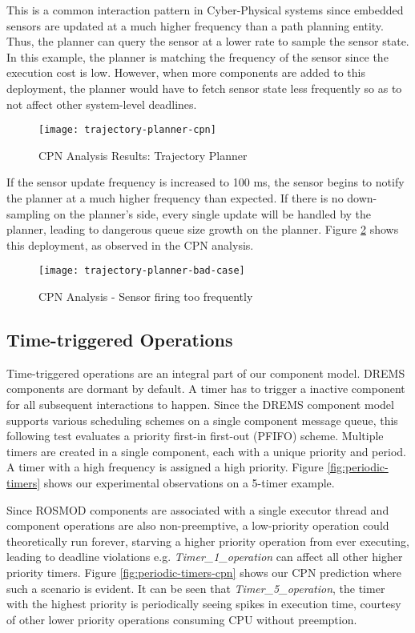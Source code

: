 This is a common interaction pattern in Cyber-Physical systems since embedded sensors are updated at a much higher frequency than a path planning entity. Thus, the planner can query the sensor at a lower rate to sample the sensor state. In this example, the planner is matching the frequency of the sensor since the execution cost is low. However, when more components are added to this deployment, the planner would have to fetch sensor state less frequently so as to not affect other system-level deadlines.  

\begin{figure}[h]
	\centering
	\texttt{[image: trajectory-planner-cpn]}
	\caption{CPN Analysis Results: Trajectory Planner}
	\label{fig:trajectory-planner-cpn}
\end{figure}
\FloatBarrier

If the sensor update frequency is increased to 100 ms, the sensor begins to notify the planner at a much higher frequency than expected. If there is no down-sampling on the planner's side, every single update will be handled by the planner, leading to dangerous queue size growth on the planner. Figure \ref{fig:trajectory-planner-bad-case} shows this deployment, as observed in the CPN analysis. 

\begin{figure}[h]
	\centering
	\texttt{[image: trajectory-planner-bad-case]}
	\caption{CPN Analysis - Sensor firing too frequently}
	\label{fig:trajectory-planner-bad-case}
\end{figure}
\FloatBarrier

\subsection{Time-triggered Operations}

Time-triggered operations are an integral part of our component model. DREMS components are dormant by default. A timer has to trigger a inactive component for all subsequent interactions to happen. Since the DREMS component model supports various scheduling schemes on a single component message queue, this following test evaluates a priority first-in first-out (PFIFO) scheme. Multiple timers are created in a single component, each with a unique priority and period. A timer with a high frequency is assigned a high priority. Figure \ref{fig:periodic-timers} shows our experimental observations on a 5-timer example. 

Since ROSMOD components are associated with a single executor thread and component operations are also non-preemptive, a low-priority operation could theoretically run forever, starving a higher priority operation from ever executing, leading to deadline violations e.g. \emph{Timer\_1\_operation} can affect all other higher priority timers. Figure \ref{fig:periodic-timers-cpn} shows our CPN prediction where such a scenario is evident. It can be seen that \emph{Timer\_5\_operation}, the timer with the highest priority is periodically seeing spikes in execution time, courtesy of other lower priority operations consuming CPU without preemption.

